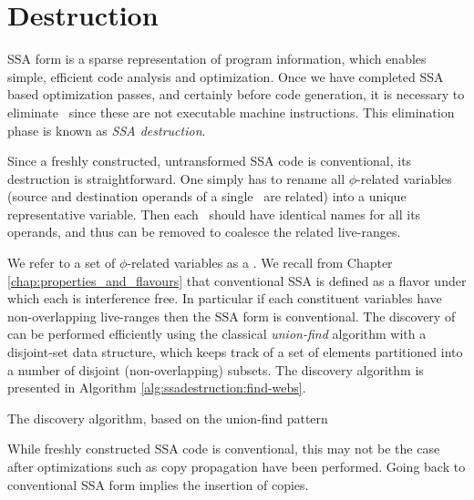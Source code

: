 \section{Destruction}
\label{sec:classical_construction_algorithm:destruction}

SSA form is a 
sparse representation of program information,
which enables simple, efficient code analysis and optimization.
Once we have completed SSA based optimization passes,
and certainly before code generation,
it is necessary to eliminate \phifuns\ since these
are not executable machine instructions.
This elimination phase is known as \textit{SSA destruction}. 

Since a freshly constructed, untransformed SSA code is conventional, its destruction is straightforward.
One simply has to rename all 
$\phi$-related variables (source and destination operands of
a single \phifun\ are related)
into a unique representative variable.
Then each \phifun\ should have identical names for all its operands,
and thus can be removed to coalesce the related live-ranges.

We refer to a set of $\phi$-related variables as
a \phiweb\index{\phiweb}. We recall from
Chapter \ref{chap:properties_and_flavours}
that conventional SSA is defined as a flavor under which each
\phiweb is interference free. In particular if each \phiwebs constituent
variables have non-overlapping live-ranges then the SSA form is conventional.
The discovery of \phiwebs can be performed efficiently 
using the classical \textit{union-find} algorithm 
with a disjoint-set data structure,
which keeps track of a set of elements
partitioned into a number of disjoint (non-overlapping) subsets.
The \phiwebs discovery algorithm is presented in 
Algorithm \ref{alg:ssadestruction:find-webs}.

\begin{algorithm}
\caption{\label{alg:ssadestruction:find-webs}The \phiwebs discovery algorithm, based on the union-find pattern}
\end{algorithm}


While freshly constructed SSA code is conventional, 
this may not be the case after optimizations 
such as copy propagation have been performed.
Going back to conventional SSA form implies the insertion of copies.

